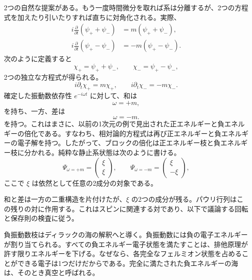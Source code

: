 2つの自然な提案がある。もう一度時間微分を取れば系は分離するが、2つの方程式を加えたり引いたりすれば直ちに対角化される。実際、
\begin{align}
i\frac{\partial}{\partial t}(\psi_++\psi_-)
&=m(\psi_++\psi_-),\\
i\frac{\partial}{\partial t}(\psi_+-\psi_-)
&=-m(\psi_+-\psi_-).
\end{align}
次のように定義すると
\begin{equation}
\chi_+=\psi_++\psi_-,
\qquad
\chi_-=\psi_+-\psi_-,
\end{equation}
2つの独立な方程式が得られる。
\begin{equation}
i\partial_t\chi_+=m\chi_+,
\qquad
i\partial_t\chi_-=-m\chi_-.
\end{equation}
確定した振動数依存性 \(e^{-i\omega t}\) に対して、和は
\begin{equation}
\omega=+m,
\end{equation}
を持ち、一方、差は
\begin{equation}
\omega=-m.
\end{equation}
を持つ。これはまさに、以前の1次元の例で見出された正エネルギーと負エネルギーの倍化である。すなわち、相対論的方程式は再び正エネルギーと負エネルギーの電子解を持つ。したがって、ブロックの倍化は正エネルギー枝と負エネルギー枝に分かれる。純粋な静止系状態は次のように書ける。
\begin{equation}
\Psi_{\omega=+m}=
\begin{pmatrix}
\xi\\
\xi
\end{pmatrix},
\qquad
\Psi_{\omega=-m}=
\begin{pmatrix}
\xi\\
-\xi
\end{pmatrix},
\end{equation}
ここで \(\xi\) は依然として任意の2成分の対象である。

和と差は一方の二重構造を片付けたが、\(\xi\) の2つの成分が残る。パウリ行列はこの残りの対に作用する。これはスピンに関連する対であり、以下で議論する回転と保存則の検査に従う。

\begin{classroomqa}
\end{classroomqa}

負振動数枝はディラックの海の解釈へと導く。負振動数には負の電子エネルギーが割り当てられる。すべての負エネルギー電子状態を満たすことは、排他原理が許す限りエネルギーを下げる。なぜなら、各完全なフェルミオン状態を占めることができる電子は1つだけだからである。完全に満たされた負エネルギーの海は、そのとき真空と呼ばれる。

